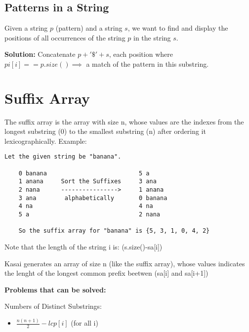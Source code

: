     
    \subsection{Patterns in a String}

        Given a string $p$ (pattern) and a string $s$, we want to find and display the positions of all occurrences of the string $p$ in the string $s$.

        \textbf{Solution:} Concatenate $p + '\$' + s$, each position where $pi[i] == p.size() \implies$ a match of the pattern in this substring.


\section{Suffix Array} 

    The suffix array is the array with size n, whose values are the indexes 
    from the longest substring (0) to the smallest substring (n) after ordering it lexicographically. 
    Example:

    \begin{lstlisting}[language=raw]
    Let the given string be "banana".

    0 banana                          5 a
    1 anana     Sort the Suffixes     3 ana
    2 nana      ---------------->     1 anana  
    3 ana        alphabetically       0 banana  
    4 na                              4 na   
    5 a                               2 nana
    
    So the suffix array for "banana" is {5, 3, 1, 0, 4, 2}
    \end{lstlisting}

    Note that the length of the string i is: (s.size()-sa[i])


    Kasai generates an array of size n (like the suffix array), 
    whose values indicates the lenght of the longest common prefix beetwen (sa[i] and sa[i+1])


    \textbf{Problems that can be solved:}

    Numbers of Distinct Substrings: 
    
    \begin{itemize}
    \item $\frac{n(n+1)}{2} - lcp[i]$ (for all i)
    \end{itemize}

